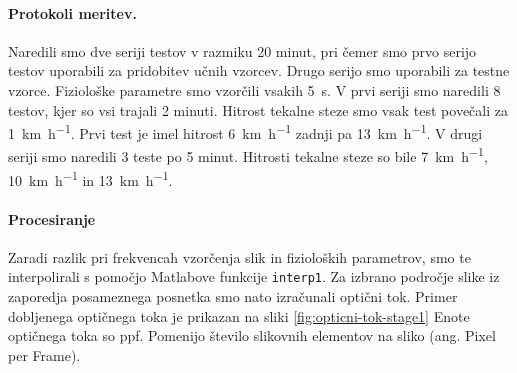 \paragraph{Protokoli meritev.}
Naredili smo dve seriji testov v razmiku 20 minut, pri čemer smo prvo serijo testov uporabili za pridobitev učnih vzorcev. Drugo serijo smo uporabili za testne vzorce. Fiziološke parametre smo vzorčili vsakih \SI{5}{\s}. V prvi seriji smo naredili 8 testov, kjer so vsi trajali 2 minuti. Hitrost tekalne steze smo vsak test povečali za \SI{1}{\km\per\hour}. Prvi test je imel hitrost  \SI{6}{\km\per\hour} zadnji pa \SI{13}{\km\per\hour}. V drugi seriji smo naredili 3 teste po 5 minut. Hitrosti tekalne steze so bile  \SI{7}{\km\per\hour}, \SI{10}{\km\per\hour} in \SI{13}{\km\per\hour}.

\paragraph{Procesiranje}\label{sec:elementarni-postopek}
Zaradi razlik pri frekvencah vzorčenja slik in fizioloških parametrov, smo te interpolirali s pomočjo Matlabove funkcije \texttt{interp1}. Za izbrano področje slike iz zaporedja posameznega posnetka smo nato izračunali optični tok. Primer dobljenega optičnega toka je prikazan na sliki \ref{fig:opticni-tok-stage1} Enote optičnega toka so \si{ppf}. Pomenijo število slikovnih elementov na sliko (ang. Pixel per Frame).


